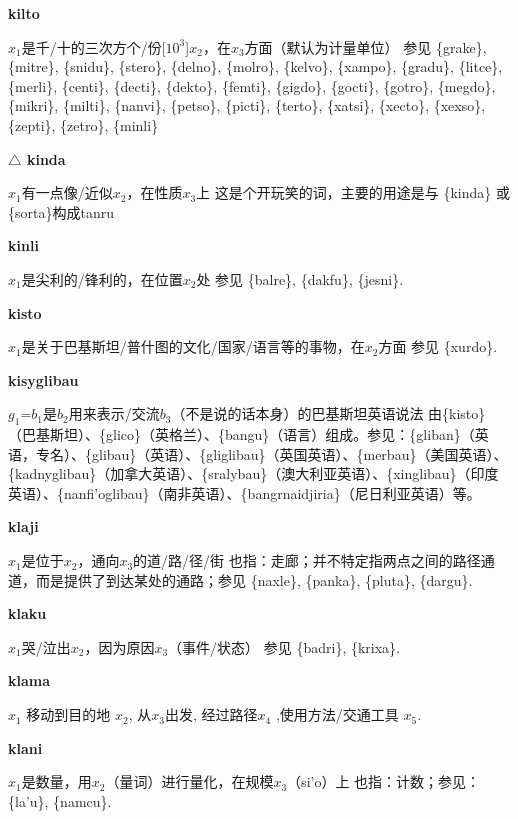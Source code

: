 \documentclass[notitlepage,twocolumn,a4paper,10pt]{book}
\begin{document}
{\sffamily\bfseries kilto}\enspace {\ttfamily\bfseries[        ki'o]}  $x_1$是千\slash{}十的三次方个\slash{}份[$10^{3}$]$x_2$，在$x_3$方面（默认为计量单位） \textemdash{} 参见 \{grake\}, \{mitre\}, \{snidu\}, \{stero\}, \{delno\}, \{molro\}, \{kelvo\}, \{xampo\}, \{gradu\}, \{litce\}, \{merli\}, \{centi\}, \{decti\}, \{dekto\}, \{femti\}, \{gigdo\}, \{gocti\}, \{gotro\}, \{megdo\}, \{mikri\}, \{milti\}, \{nanvi\}, \{petso\}, \{picti\}, \{terto\}, \{xatsi\}, \{xecto\}, \{xexso\}, \{zepti\}, \{zetro\}, \{minli\}

{\sffamily\bfseries $\triangle$ kinda} $x_1$有一点像\slash{}近似$x_2$，在性质$x_3$上 \textemdash{} 这是个开玩笑的词，主要的用途是与 \{kinda\} 或\{sorta\}构成tanru

{\sffamily\bfseries kinli}\enspace {\ttfamily\bfseries[kil]}  $x_1$是尖利的\slash{}锋利的，在位置$x_2$处 \textemdash{} 参见 \{balre\}, \{dakfu\}, \{jesni\}.

{\sffamily\bfseries kisto}\enspace {\ttfamily\bfseries[kis]}  $x_1$是关于巴基斯坦\slash{}普什图的文化\slash{}国家\slash{}语言等的事物，在$x_2$方面 \textemdash{} 参见 \{xurdo\}.

{\sffamily\bfseries kisyglibau} $g_1$=$b_1$是$b_2$用来表示\slash{}交流$b_3$（不是说的话本身）的巴基斯坦英语说法 \textemdash{} 由\{kisto\}（巴基斯坦）、\{glico\}（英格兰）、\{bangu\}（语言）组成。参见：\{gliban\}（英语，专名）、\{glibau\}（英语）、\{gliglibau\}（英国英语）、\{merbau\}（美国英语）、\{kadnyglibau\}（加拿大英语）、\{sralybau\}（澳大利亚英语）、\{xinglibau\}（印度英语）、\{nanfi'oglibau\}（南非英语）、\{bangrnaidjiria\}（尼日利亚英语）等。

{\sffamily\bfseries klaji}\enspace {\ttfamily\bfseries[laj]}  $x_1$是位于$x_2$，通向$x_3$的道\slash{}路\slash{}径\slash{}街 \textemdash{} 也指：走廊；并不特定指两点之间的路径通道，而是提供了到达某处的通路；参见 \{naxle\}, \{panka\}, \{pluta\}, \{dargu\}.

{\sffamily\bfseries klaku}\enspace {\ttfamily\bfseries[kak]}  $x_1$哭\slash{}泣出$x_2$，因为原因$x_3$（事件\slash{}状态） \textemdash{} 参见 \{badri\}, \{krixa\}.

{\sffamily\bfseries klama}\enspace {\ttfamily\bfseries[    kla]}  $x_1$ 移动到目的地 $x_2$, 从$x_3$出发, 经过路径$x_4$ ,使用方法\slash{}交通工具 $x_5$.

{\sffamily\bfseries klani}\enspace {\ttfamily\bfseries[        lai]}  $x_1$是数量，用$x_2$（量词）进行量化，在规模$x_3$（si'o）上 \textemdash{} 也指：计数；参见：\{la'u\}, \{namcu\}.
\end{document}
